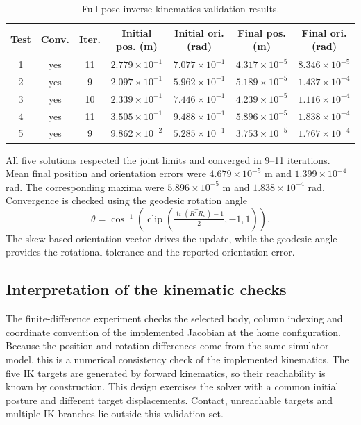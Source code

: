 \documentclass[12pt,a4paper]{article}
\begin{document}
\begin{table}[!htbp]
\centering
\caption{Full-pose inverse-kinematics validation results.}
\scriptsize
\begin{tabular}{ccccccc}
\toprule
Test & Conv. & Iter. & Initial pos. (m) & Initial ori. (rad) & Final pos. (m) & Final ori. (rad)\\
\midrule
1 & yes & 11 & $2.779\times10^{-1}$ & $7.077\times10^{-1}$ & $4.317\times10^{-5}$ & $8.346\times10^{-5}$\\
2 & yes & 9  & $2.097\times10^{-1}$ & $5.962\times10^{-1}$ & $5.189\times10^{-5}$ & $1.437\times10^{-4}$\\
3 & yes & 10 & $2.339\times10^{-1}$ & $7.446\times10^{-1}$ & $4.239\times10^{-5}$ & $1.116\times10^{-4}$\\
4 & yes & 11 & $3.505\times10^{-1}$ & $9.488\times10^{-1}$ & $5.896\times10^{-5}$ & $1.838\times10^{-4}$\\
5 & yes & 9  & $9.862\times10^{-2}$ & $5.285\times10^{-1}$ & $3.753\times10^{-5}$ & $1.767\times10^{-4}$\\
\bottomrule
\end{tabular}
\end{table}

All five solutions respected the joint limits and converged in 9--11 iterations. Mean final position and orientation errors were $4.679\times10^{-5}$ m and $1.399\times10^{-4}$ rad. The corresponding maxima were $5.896\times10^{-5}$ m and $1.838\times10^{-4}$ rad. Convergence is checked using the geodesic rotation angle
\[
\theta=\cos^{-1}\!\left(\operatorname{clip}\left(\tfrac{\operatorname{tr}(R^TR_d)-1}{2},-1,1\right)\right).
\]
The skew-based orientation vector drives the update, while the geodesic angle provides the rotational tolerance and the reported orientation error.

\subsection{Interpretation of the kinematic checks}
The finite-difference experiment checks the selected body, column indexing and coordinate convention of the implemented Jacobian at the home configuration. Because the position and rotation differences come from the same simulator model, this is a numerical consistency check of the implemented kinematics. The five IK targets are generated by forward kinematics, so their reachability is known by construction. This design exercises the solver with a common initial posture and different target displacements. Contact, unreachable targets and multiple IK branches lie outside this validation set.
\end{document}
